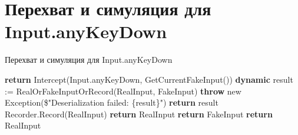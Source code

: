 \section{Перехват и симуляция для Input.anyKeyDown}
\begin{algorithm}
	\caption{Перехват и симуляция для Input.anyKeyDown}\label{alg:input}
	\begin{algorithmic}
		\State \textbf{return} Intercept(Input.anyKeyDown, 
		\State GetCurrentFakeInput())
		\EndProcedure
		\State \textbf{dynamic} result := RealOrFakeInputOrRecord(RealInput, FakeInput)
		\State \textbf{throw} new Exception(\$"Deserialization failed: \{result\}")
		\EndIf
		\State \textbf{return} result
		\EndProcedure
		\State Recorder.Record(RealInput)
		\State \textbf{return} RealInput
		\State \textbf{return} FakeInput
		\Else
		\State \textbf{return} RealInput
		\EndIf
		\EndProcedure
	\end{algorithmic}
\end{algorithm}